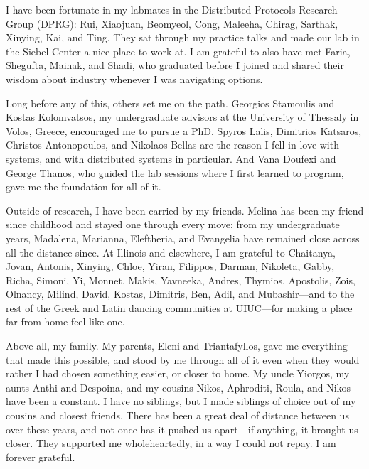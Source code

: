 {I have been fortunate in my labmates in the Distributed Protocols Research
Group (DPRG): Rui, Xiaojuan, Beomyeol, Cong, Maleeha, Chirag, Sarthak, Xinying, Kai, and
Ting. They sat through my practice talks and made our lab in the Siebel Center
a nice place to work at. I am grateful to also have met Faria, Shegufta, Mainak,
and Shadi, who graduated before I joined and shared their wisdom about
industry whenever I was navigating options.

Long before any of this, others set me on the path. Georgios Stamoulis and
Kostas Kolomvatsos, my undergraduate advisors at the University of Thessaly in
Volos, Greece, encouraged me to pursue a PhD. Spyros Lalis, Dimitrios
Katsaros, Christos Antonopoulos, and Nikolaos Bellas are the reason I fell in
love with systems, and with distributed systems in particular. And Vana
Doufexi and George Thanos, who guided the lab sessions where I first learned
to program, gave me the foundation for all of it.

Outside of research, I have been carried by my friends. Melina has been my
friend since childhood and stayed one through every move; from my
undergraduate years, Madalena, Marianna, Eleftheria, and Evangelia have
remained close across all the distance since. At Illinois and elsewhere, I am
grateful to Chaitanya, Jovan, Antonis, Xinying, Chloe, Yiran, Filippos,
Darman, Nikoleta, Gabby, Richa, Simoni, Yi, Monnet, Makis, Yavneeka, Andres,
Thymios, Apostolis, Zois, Olnancy, Milind, David, Kostas, Dimitris, Ben, Adil,
and Mubashir---and to the rest of the Greek and Latin dancing communities at UIUC---for making a
place far from home feel like one.

Above all, my family. My parents, Eleni and Triantafyllos, gave me everything
that made this possible, and stood by me through all of it even when they
would rather I had chosen something easier, or closer to home. My
uncle Yiorgos, my aunts Anthi and Despoina, and my cousins Nikos, Aphroditi,
Roula, and Nikos have been a constant. I have no siblings, but I made siblings
of choice out of my cousins and closest friends. There has been a great deal
of distance between us over these years, and not once has it pushed us
apart---if anything, it brought us closer. They supported me wholeheartedly, in a way I could not repay. I am forever grateful.

}
